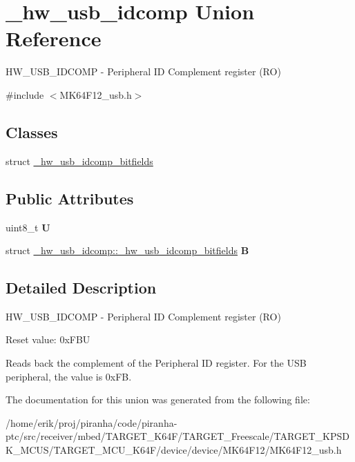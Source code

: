 \hypertarget{union__hw__usb__idcomp}{}\section{\+\_\+hw\+\_\+usb\+\_\+idcomp Union Reference}
\label{union__hw__usb__idcomp}


H\+W\+\_\+\+U\+S\+B\+\_\+\+I\+D\+C\+O\+MP -\/ Peripheral ID Complement register (RO)  




{\ttfamily \#include $<$M\+K64\+F12\+\_\+usb.\+h$>$}

\subsection*{Classes}
\begin{DoxyCompactItemize}
\item 
struct \hyperlink{struct__hw__usb__idcomp_1_1__hw__usb__idcomp__bitfields}{\+\_\+hw\+\_\+usb\+\_\+idcomp\+\_\+bitfields}
\end{DoxyCompactItemize}
\subsection*{Public Attributes}
\begin{DoxyCompactItemize}
\item 
uint8\+\_\+t {\bfseries U}\hypertarget{union__hw__usb__idcomp_a0188c8cc5bfa47178ffe0328291e127f}{}\label{union__hw__usb__idcomp_a0188c8cc5bfa47178ffe0328291e127f}

\item 
struct \hyperlink{struct__hw__usb__idcomp_1_1__hw__usb__idcomp__bitfields}{\+\_\+hw\+\_\+usb\+\_\+idcomp\+::\+\_\+hw\+\_\+usb\+\_\+idcomp\+\_\+bitfields} {\bfseries B}\hypertarget{union__hw__usb__idcomp_a43397af3d994a026817fbe25df2997f6}{}\label{union__hw__usb__idcomp_a43397af3d994a026817fbe25df2997f6}

\end{DoxyCompactItemize}


\subsection{Detailed Description}
H\+W\+\_\+\+U\+S\+B\+\_\+\+I\+D\+C\+O\+MP -\/ Peripheral ID Complement register (RO) 

Reset value\+: 0x\+F\+BU

Reads back the complement of the Peripheral ID register. For the U\+SB peripheral, the value is 0x\+FB. 

The documentation for this union was generated from the following file\+:\begin{DoxyCompactItemize}
\item 
/home/erik/proj/piranha/code/piranha-\/ptc/src/receiver/mbed/\+T\+A\+R\+G\+E\+T\+\_\+\+K64\+F/\+T\+A\+R\+G\+E\+T\+\_\+\+Freescale/\+T\+A\+R\+G\+E\+T\+\_\+\+K\+P\+S\+D\+K\+\_\+\+M\+C\+U\+S/\+T\+A\+R\+G\+E\+T\+\_\+\+M\+C\+U\+\_\+\+K64\+F/device/device/\+M\+K64\+F12/M\+K64\+F12\+\_\+usb.\+h\end{DoxyCompactItemize}
